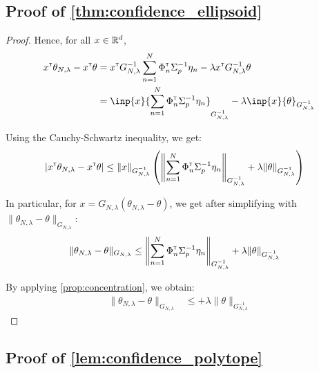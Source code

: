 \documentclass{article}
\begin{document}
\subsection{Proof of \autoref{thm:confidence_ellipsoid}}

\begin{proof}

Hence, for all $x\in\mathbb{R}^d$,
\begin{align*}
    x^\transp\theta_{N,\lambda}  -x^\transp\theta &= x^\transp G_{N, \lambda}^{-1}\sum_{n=1}^N \Phi_n^\transp \Sigma_p^{-1}\eta_n
    - \lambda x^\transp G_{N, \lambda}^{-1}\theta\\
    &= \inp{x}{\sum_{n=1}^N \Phi_n^\transp \Sigma_p^{-1}\eta_n}_{G_{N, \lambda}^{-1}} - \lambda\inp{x}{\theta}_{G_{N, \lambda}^{-1}}
\end{align*}

Using the Cauchy-Schwartz inequality, we get:
\begin{align*}
    |x^{\mathsf{\scriptscriptstyle T}}\theta_{N,\lambda}  -x^{\mathsf{\scriptscriptstyle T}}\theta| &\leq \|x\|_{G_{N, \lambda}^{-1}}\left(\left\|\sum_{n=1}^N \Phi_n^{\mathsf{\scriptscriptstyle T}} \Sigma_p^{-1}\eta_n\right\|_{G_{N, \lambda}^{-1}} + \lambda\|\theta\|_{G_{N, \lambda}^{-1}}\right)
\end{align*}

In particular, for $x = G_{N,\lambda}(\theta_{N,\lambda} - \theta)$, we get after simplifying with $\| \theta_{N,\lambda}  - \theta\|_{G_{N,\lambda}}$:
\begin{align*}
    \| \theta_{N,\lambda}  - \theta\|_{G_{N,\lambda}} &\leq \left\|\sum_{n=1}^N \Phi_n^{\mathsf{\scriptscriptstyle T}} \Sigma_p^{-1}\eta_n\right\|_{G_{N, \lambda}^{-1}} + \lambda\|\theta\|_{G_{N, \lambda}^{-1}}
\end{align*}

By applying \autoref{prop:concentration}, we obtain:
\begin{align*}
    \| \theta_{N,\lambda}  - \theta\|_{G_{N,\lambda}} &\leq 
     + \lambda\|\theta\|_{G_{N, \lambda}^{-1}}
\end{align*}
\end{proof}


\subsection{Proof of \autoref{lem:confidence_polytope}}
\end{document}
